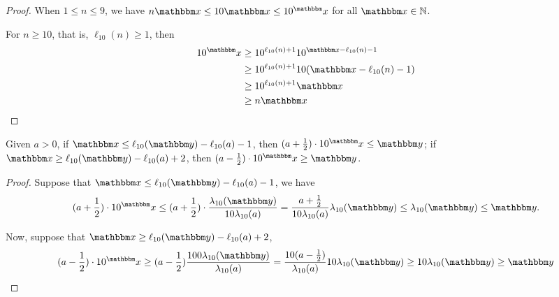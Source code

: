 \begin{proof}
When $1\le n\le 9$, we have $n\ivarx \le 10\ivarx \le 10^\ivarx$ for all $\ivarx \in\mathbb N$.

For $n\ge 10$, that is, $\ell_{10}(n)\ge 1$, then 
$$\begin{aligned}
10^\ivarx&\ge 10^{\ell_{10}(n)+1}10^{\ivarx-\ell_{10}(n)-1}\\
    &\ge 10^{\ell_{10}(n)+1}10(\ivarx-\ell_{10}(n)-1)\\
    &\ge 10^{\ell_{10}(n)+1}\ivarx\\
    &\ge n\ivarx
\end{aligned}$$
\end{proof}

\begin{proposition} \label{prop:case}
    Given $a>0$, 
    if $\ivarx\le \ell_{10}(\ivary)-\ell_{10}(a)-1$, then $(a+\frac{1}{2})\cdot 10^\ivarx\le\ivary$; 
    if $\ivarx\ge \ell_{10}(\ivary)-\ell_{10}(a)+2$, then $(a-\frac{1}{2})\cdot 10^\ivarx\ge\ivary$.
\end{proposition}

\begin{proof}

Suppose that $\ivarx\le \ell_{10}(\ivary)-\ell_{10}(a)-1$,
we have 
$$
(a+\frac{1}{2})\cdot 10^\ivarx \le (a+\frac{1}{2})\cdot \frac{\lambda_{10}(\ivary)}{10\lambda_{10}(a)}=\frac{a+\frac{1}{2}}{10\lambda_{10} (a)}\lambda_{10}(\ivary)\le\lambda_{10}(\ivary) \le \ivary. 
$$

Now, suppose that $\ivarx\ge \ell_{10}(\ivary)-\ell_{10}(a)+2$,
$$
(a-\frac{1}{2})\cdot 10^\ivarx \ge (a-\frac{1}{2})\frac{100\lambda_{10}(\ivary)}{\lambda_{10}(a)}=\frac{10(a-\frac{1}{2})}{\lambda_{10}(a)}10\lambda_{10}(\ivary)\ge 10\lambda_{10}(\ivary) \ge \ivary
$$
\end{proof}



